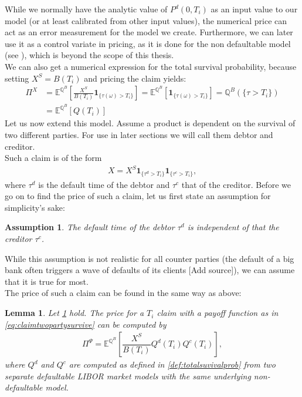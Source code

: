 \documentclass[12pt]{article}
\newtheorem{assumption}{Assumption}[section]
\newtheorem{lemma}[theorem]{Lemma}
\begin{document}
	While we normally have the analytic value of $P^d(0, T_i)$ as an input value to our model (or at least calibrated from other input values), the numerical price can act as an error measurement for the model we create. Furthermore, we can later use it as a control variate in pricing, as it is done for the non defaultable model (see \cite{FriesBook}), which is beyond the scope of this thesis.\\
	We can also get a numerical expression for the total survival probability, because setting
	$X^S = B(T_i)$ and pricing the claim yields:
	\begin{align*}
		\Pi^X &= \mathbb{E}^{\mathbb{Q}^B}\left[ \frac{X^S}{B(T_i)} \mathbf{1}_{\{\tau(\omega) > T_i\}}\right] = \mathbb{E}^{\mathbb{Q}^B}\left[ \mathbf{1}_{\{\tau(\omega) > T_i\}}\right]
		= \mathbb{Q}^B(\{\tau > T_i\})\\
		&= \mathbb{E}^{\mathbb{Q}^B}\left[ Q(T_i)\right]
	\end{align*}
	Let us now extend this model. Assume a product is dependent on the survival of two different parties. For use in later sections we will call them debtor and  creditor.\\
	Such a claim is of the form
	\begin{align}\label{eq:claimtwopartysurvive}
		X = X^S\mathbf{1}_{\{\tau^d > T_i\}}\mathbf{1}_{\{\tau^c > T_i\}},
	\end{align}
	where $\tau^d$ is the default time of the debtor and $\tau^c$ that of the creditor.
	Before we go on to find the price of such a claim, let us first state an assumption for simplicity's sake:
	\begin{assumption}\label{as:counterpartiesareindependent}
		The default time of the debtor $\tau^d$ is independent of that the creditor $\tau^c$.
	\end{assumption}
	While this assumption is not realistic for all counter parties (the default of a big bank often triggers a wave of defaults of its clients \color{red}[Add source]\color{black}), %
	we can assume that it is true for most.\\
	The price of such a claim can be found in the same way as above:
	\begin{lemma}\label{lem:creditordefPrice}
		Let \cref{as:counterpartiesareindependent} hold. The price for a $T_i$ claim with a payoff function as in \cref{eq:claimtwopartysurvive} can be computed by
		\begin{align*}
			\Pi^\Psi = \mathbb{E}^{\mathbb{Q}^B}\left[\dfrac{X^S}{B(T_i)}Q^d(T_i)Q^c(T_i)\right],
		\end{align*}
		where $Q^d$ and $Q^c$ are computed as defined in \cref{def:totalsuvivalprob} from two separate defaultable LIBOR market models with the same underlying non-defaultable model.
	\end{lemma}
\end{document}
